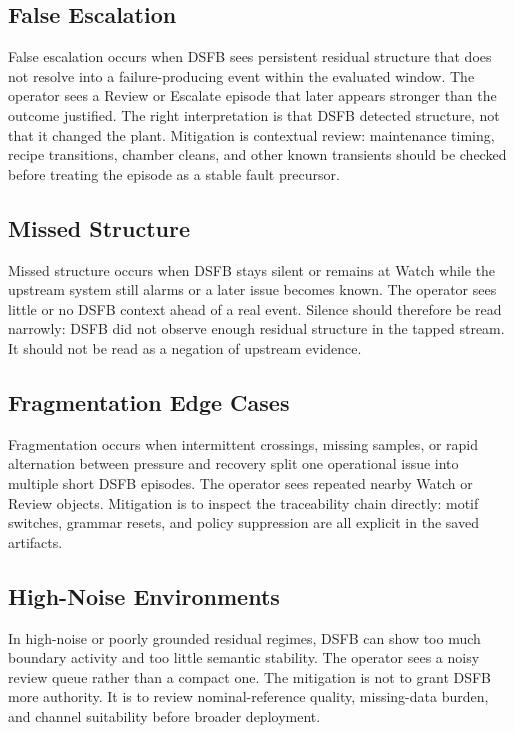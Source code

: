 \documentclass[11pt,letterpaper]{article}
\theoremstyle{scresult}
\begin{document}
\subsection{False Escalation}

False escalation occurs when DSFB sees persistent residual structure that does
not resolve into a failure-producing event within the evaluated window. The
operator sees a Review or Escalate episode that later appears stronger than the
outcome justified. The right interpretation is that DSFB detected structure,
not that it changed the plant. Mitigation is contextual review: maintenance
timing, recipe transitions, chamber cleans, and other known transients should
be checked before treating the episode as a stable fault precursor.

\subsection{Missed Structure}

Missed structure occurs when DSFB stays silent or remains at Watch while the
upstream system still alarms or a later issue becomes known. The operator sees
little or no DSFB context ahead of a real event. Silence should therefore be
read narrowly: DSFB did not observe enough residual structure in the tapped
stream. It should not be read as a negation of upstream evidence.

\subsection{Fragmentation Edge Cases}

Fragmentation occurs when intermittent crossings, missing samples, or rapid
alternation between pressure and recovery split one operational issue into
multiple short DSFB episodes. The operator sees repeated nearby Watch or Review
objects. Mitigation is to inspect the traceability chain directly: motif
switches, grammar resets, and policy suppression are all explicit in the saved
artifacts.

\subsection{High-Noise Environments}

In high-noise or poorly grounded residual regimes, DSFB can show too much
boundary activity and too little semantic stability. The operator sees a noisy
review queue rather than a compact one. The mitigation is not to grant DSFB
more authority. It is to review nominal-reference quality, missing-data burden,
and channel suitability before broader deployment.
\end{document}
